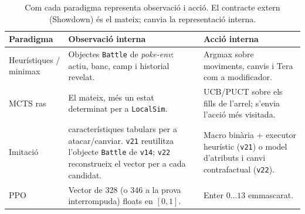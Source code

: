 \begin{table}[htbp]
\centering
\caption{Com cada paradigma representa observació i acció. El contracte extern (Showdown) és el mateix; canvia la representació interna.}
\label{tab:paradigm_spaces}
\small
\begin{tabularx}{\textwidth}{l>{\raggedright\arraybackslash}X>{\raggedright\arraybackslash}X}
\toprule
\textbf{Paradigma} & \textbf{Observació interna} & \textbf{Acció interna} \\
\midrule
Heurístiques / minimax & Objectes \texttt{Battle} de \textit{poke-env}: actiu, banc, camp i historial revelat. & Argmax sobre moviments, canvis i Tera com a modificador. \\
MCTS ras & El mateix, més un estat determinat per a \texttt{LocalSim}. & UCB/PUCT sobre els fills de l'arrel; s'envia l'acció més visitada. \\
Imitació & 1.150 característiques tabulars per a atacar/canviar. \texttt{v21} reutilitza l'objecte \texttt{Battle} de \texttt{v14}; \texttt{v22} reconstrueix el vector per a cada candidat. & Macro binària + executor heurístic (\texttt{v21}) o model d'atributs i canvi contrafactual (\texttt{v22}). \\
PPO & Vector de 328 (o 346 a la prova interrompuda) floats en $[0,1]$. & Enter $0\ldots 13$ emmascarat. \\
\bottomrule
\end{tabularx}
\end{table}
